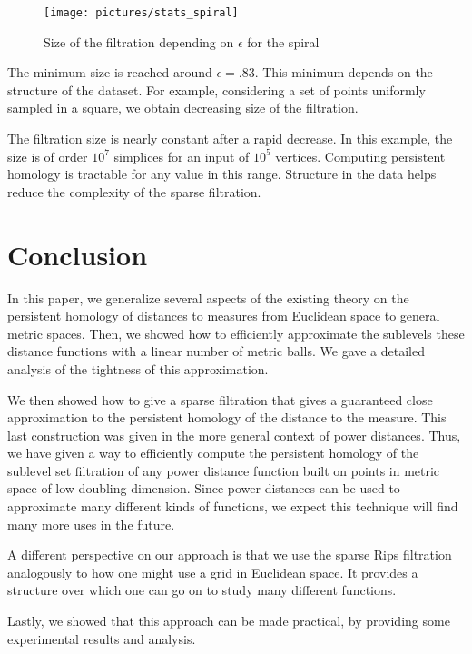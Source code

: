 \documentclass[a4paper]{article}
\begin{document}
\begin{figure}[!ht]
\centering
\texttt{[image: pictures/stats\_spiral]}
\caption{Size of the filtration depending on $\epsilon$ for the spiral}\label{fStatsSpiral}
\end{figure}

The minimum size is reached around $\epsilon=.83$.
This minimum depends on the structure of the dataset.
For example, considering a set of points uniformly sampled in a square, we obtain decreasing size of the filtration.

The filtration size is nearly constant after a rapid decrease. 
In this example, the size is of order $10^7$ simplices for an input of $10^5$ vertices.
Computing persistent homology is tractable for any value in this range.
Structure in the data helps reduce the complexity of the sparse filtration.



\section{Conclusion} \label{sec:conclusion}

  In this paper, we generalize several aspects of the existing theory on the persistent homology of distances to measures from Euclidean space to general metric spaces.
  Then, we showed how to efficiently approximate the sublevels these distance functions with a linear number of metric balls.
  We gave a detailed analysis of the tightness of this approximation.
  
  We then showed how to give a sparse filtration that gives a guaranteed close approximation to the persistent homology of the distance to the measure.
  This last construction was given in the more general context of power distances.
  Thus, we have given a way to efficiently compute the persistent homology of the sublevel set filtration of any power distance function built on points in metric space of low doubling dimension.
  Since power distances can be used to approximate many different kinds of functions, we expect this technique will find many more uses in the future.
  
  A different perspective on our approach is that we use the sparse Rips filtration analogously to how one might use a grid in Euclidean space.
  It provides a structure over which one can go on to study many different functions.
  
  Lastly, we showed that this approach can be made practical, by providing some experimental results and analysis.





\end{document}
